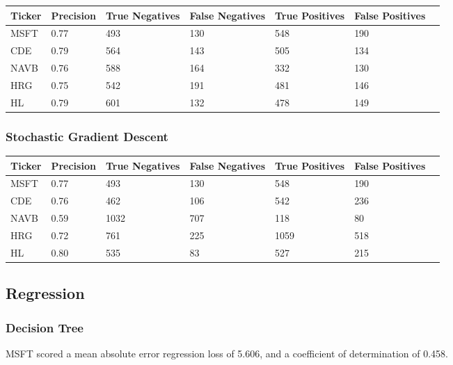 \begin{center}
    \begin{tabular}{ | l | l | l | | l | l | l | p{5cm} |}
    \hline
    Ticker & Precision & True Negatives & False Negatives & True Positives & False Positives \\ \hline
    MSFT & 0.77 & 493 & 130 & 548 & 190 \\ \hline
    CDE & 0.79 & 564 & 143 & 505 & 134 \\ \hline
    NAVB & 0.76 & 588 & 164 & 332 & 130 \\ \hline
    HRG & 0.75 & 542 & 191 & 481 & 146 \\ \hline
    HL & 0.79 & 601 & 132 & 478 & 149 \\
    \hline
    \end{tabular}
\end{center}

\subsubsection{Stochastic Gradient Descent}

\begin{center}
    \begin{tabular}{ | l | l | l | | l | l | l | p{5cm} |}
    \hline
    Ticker & Precision & True Negatives & False Negatives & True Positives & False Positives \\ \hline
    MSFT & 0.77 & 493 & 130 & 548 & 190 \\ \hline
    CDE & 0.76 & 462 & 106 & 542 & 236 \\ \hline
    NAVB & 0.59 & 1032 & 707 & 118 & 80 \\ \hline
    HRG & 0.72 & 761 & 225 & 1059 & 518 \\ \hline
    HL & 0.80 & 535 & 83 & 527 & 215 \\
    \hline
    \end{tabular}
\end{center}

\subsection{Regression}

\subsubsection{Decision Tree}
MSFT scored a mean absolute error regression loss of 5.606, and a coefficient of determination of 0.458.

